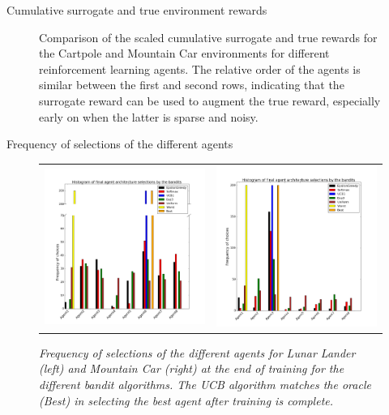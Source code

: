 \documentclass[final]{beamer}
\newlength{\onecolwid}
\begin{document}
\begin{frame}[t]
\begin{columns}[t]
\begin{column}{\onecolwid}
\begin{block}{Cumulative surrogate and true environment rewards}
\begin{figure}[h!]
\caption{Comparison of the scaled cumulative surrogate and true rewards for the Cartpole and Mountain Car environments for different reinforcement learning agents. The relative order of the agents is similar between the first and second rows, indicating that the surrogate reward can be used to augment the true reward, especially early on when the latter is sparse and noisy.}
\label{fig:cart_mc_rewards}
\end{figure}

\end{block}

\vspace*{-1.5cm}

\begin{block}{Frequency of selections of the different agents}

\vspace*{-1.5cm}

\begin{figure}[h!]
   \begin{tabular}{ll}
     \includegraphics[width=0.5\columnwidth]{misc/lunar_bar.png} &
	 \includegraphics[width=0.5\columnwidth]{misc/mc_bar2.png} \\
	 \end{tabular}
   \caption{\em Frequency of selections of the different agents for Lunar Lander (left) and Mountain Car (right) at the end of training for the different bandit algorithms. The UCB
   algorithm matches the oracle (Best) in selecting the best agent after training is complete.}
\label{fig:lunar_mc_bar}
\end{figure}


\end{block}
\end{column}
\end{columns}
\end{frame}
\end{document}
